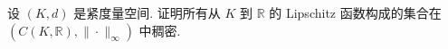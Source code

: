 

\begin{exercise}[9]
    设 $(K,d)$ 是紧度量空间. 证明所有从 $K$ 到 $\mathbb{R}$ 的 Lipschitz 函数构成的集合在 $(C(K,\mathbb{R}),\|\cdot\|_{\infty})$ 中稠密.
\end{exercise}

